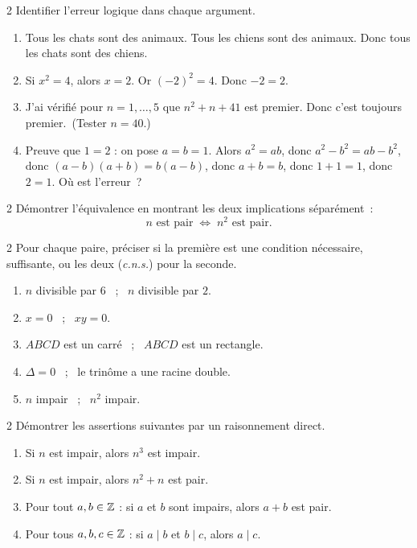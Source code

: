 \begin{exo}{2}
Identifier l'erreur logique dans chaque argument.
\begin{enumerate}
  \item \og Tous les chats sont des animaux. Tous les chiens sont des animaux.
        Donc tous les chats sont des chiens.\fg
  \item \og Si $x^2 = 4$, alors $x = 2$. Or $(-2)^2 = 4$. Donc $-2 = 2$.\fg
  \item \og J'ai v\'erifi\'e pour $n=1,\ldots,5$ que $n^2+n+41$ est premier.
        Donc c'est toujours premier.\fg\ (Tester $n=40$.)
  \item Preuve que $1 = 2$ : on pose $a=b=1$.
        Alors $a^2 = ab$, donc $a^2 - b^2 = ab - b^2$,
        donc $(a-b)(a+b) = b(a-b)$,
        donc $a+b = b$, donc $1+1=1$, donc $2=1$.
        O\`u est l'erreur~?
\end{enumerate}
\end{exo}

\begin{exo}{2}
D\'emontrer l'\'equivalence en montrant les deux implications s\'epar\'ement~:
$$n \text{ est pair} \;\Leftrightarrow\; n^2 \text{ est pair}.$$
\end{exo}

\begin{exo}{2}
Pour chaque paire, pr\'eciser si la premi\`ere est une condition
n\'ecessaire, suffisante, ou les deux (\textit{c.n.s.}) pour la seconde.
\begin{enumerate}
  \item $n$ divisible par $6$ ~;~ $n$ divisible par $2$.
  \item $x = 0$ ~;~ $xy = 0$.
  \item $ABCD$ est un carr\'e ~;~ $ABCD$ est un rectangle.
  \item $\Delta = 0$ ~;~ le trin\^{o}me a une racine double.
  \item $n$ impair ~;~ $n^2$ impair.
\end{enumerate}
\end{exo}

\begin{exo}{2}
D\'emontrer les assertions suivantes par un raisonnement direct.
\begin{enumerate}
  \item Si $n$ est impair, alors $n^3$ est impair.
  \item Si $n$ est impair, alors $n^2 + n$ est pair.
  \item Pour tout $a, b \in \mathbb{Z}$ : si $a$ et $b$ sont impairs,
        alors $a + b$ est pair.
  \item Pour tous $a, b, c \in \mathbb{Z}$ : si $a \mid b$ et $b \mid c$, alors $a \mid c$.
\end{enumerate}
\end{exo}

